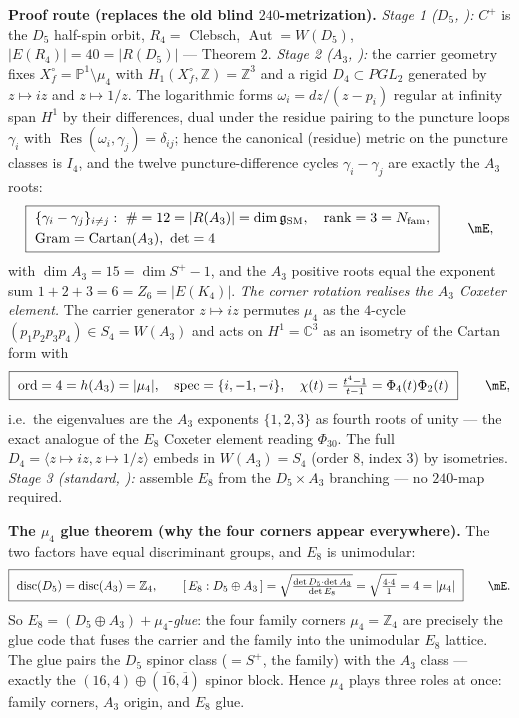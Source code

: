 \noindent\textbf{Proof route (replaces the old blind $240$-metrization).}
\emph{Stage 1 ($D_5$, \mE):} $C^+$ is the $D_5$ half-spin orbit, $R_4=$ Clebsch, $\operatorname{Aut}=W(D_5)$,
$|E(R_4)|=40=|R(D_5)|$ --- Theorem 2.
\emph{Stage 2 ($A_3$, \mE):} the carrier geometry fixes $X_f^\circ=\mathbb P^1\setminus\mu_4$ with
$H_1(X_f^\circ,\mathbb Z)=\mathbb Z^3$ and a rigid $D_4\subset PGL_2$ generated by $z\mapsto iz$ and
$z\mapsto 1/z$. The logarithmic forms $\omega_i=dz/(z-p_i)$ regular at infinity span $H^1$ by their
differences, dual under the residue pairing to the puncture loops $\gamma_i$ with $\operatorname{Res}(\omega_i,\gamma_j)=\delta_{ij}$;
hence the canonical (residue) metric on the puncture classes is $I_4$, and the twelve
puncture-difference cycles $\gamma_i-\gamma_j$ are exactly the $A_3$ roots:
\begin{equation}
  \boxed{\ \begin{aligned}
    &\{\gamma_i-\gamma_j\}_{i\ne j}:\ \#=12=|R(A_3)|=\dimg,\quad \operatorname{rank}=3=\Nfam,\\
    &\text{Gram}=\text{Cartan}(A_3),\ \det=4
  \end{aligned}\ }\qquad\mE ,
\end{equation}
with $\dim A_3=15=\dim S^+-1$, and the $A_3$ positive roots equal the exponent sum $1{+}2{+}3=6=Z_6=|E(K_4)|$.
\emph{The corner rotation realises the $A_3$ Coxeter element.} The carrier generator $z\mapsto iz$
permutes $\mu_4$ as the $4$-cycle $(p_1p_2p_3p_4)\in S_4=W(A_3)$ and acts on $H^1=\mathbb C^3$ as an
isometry of the Cartan form with
\begin{equation}
  \boxed{\ \text{ord}=4=h(A_3)=|\mu_4|,\quad \text{spec}=\{i,-1,-i\},\quad
  \chi(t)=\tfrac{t^4-1}{t-1}=\Phi_4(t)\Phi_2(t)\ }\qquad\mE ,
\end{equation}
i.e.\ the eigenvalues are the $A_3$ exponents $\{1,2,3\}$ as fourth roots of unity --- the exact analogue
of the $E_8$ Coxeter element reading $\Phi_{30}$. The full $D_4=\langle z\mapsto iz,z\mapsto1/z\rangle$
embeds in $W(A_3)=S_4$ (order $8$, index $3$) by isometries. \emph{Stage 3 (standard, \mE):} assemble
$E_8$ from the $D_5\times A_3$ branching --- no $240$-map required.

\noindent\textbf{The $\mu_4$ glue theorem (why the four corners appear everywhere).} The two factors
have equal discriminant groups, and $E_8$ is unimodular:
\begin{equation}
  \boxed{\ \operatorname{disc}(D_5)=\operatorname{disc}(A_3)=\mathbb Z_4,\qquad
  [\,E_8:D_5\oplus A_3\,]=\sqrt{\tfrac{\det D_5\cdot\det A_3}{\det E_8}}=\sqrt{\tfrac{4\cdot4}{1}}=4=|\mu_4|\ }\qquad\mE .
\end{equation}
So $E_8=(D_5\oplus A_3)+\mu_4$-\emph{glue}: the four family corners $\mu_4=\mathbb Z_4$ are precisely the
glue code that fuses the carrier and the family into the unimodular $E_8$ lattice. The glue pairs the
$D_5$ spinor class ($=S^+$, the family) with the $A_3$ class --- exactly the $(16,4)\oplus(\overline{16},\overline4)$
spinor block. Hence $\mu_4$ plays three roles at once: family corners, $A_3$ origin, and $E_8$ glue.

